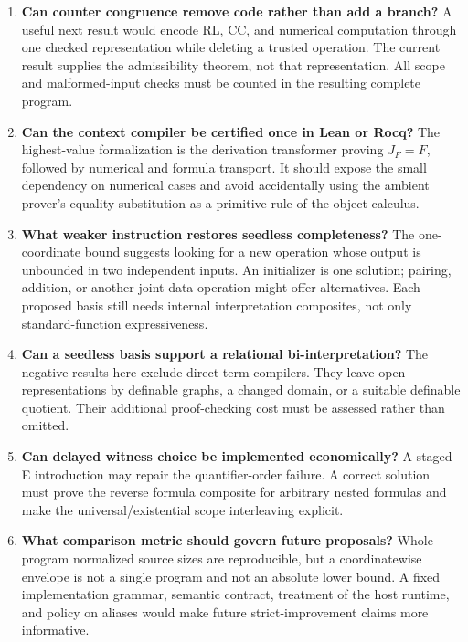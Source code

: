 \documentclass[11pt,letterpaper]{article}
\theoremstyle{definition}\newtheorem{definition}[theorem]{Definition}
\theoremstyle{remark}\newtheorem{remark}[theorem]{Remark}
\begin{document}
\begin{enumerate}
\item \textbf{Can counter congruence remove code rather than add a branch?}
  A useful next result would encode RL, CC, and numerical computation
  through one checked representation while deleting a trusted
  operation. The current result supplies the admissibility theorem, not
  that representation. All scope and malformed-input checks must be
  counted in the resulting complete program.
\item \textbf{Can the context compiler be certified once in Lean or Rocq?}
  The highest-value formalization is the derivation transformer proving
  $J_F=F$, followed by numerical and formula transport. It should expose
  the small dependency on numerical cases and avoid accidentally using
  the ambient prover's equality substitution as a primitive rule of
  the object calculus.
\item \textbf{What weaker instruction restores seedless completeness?}
  The one-coordinate bound suggests looking for a new operation whose
  output is unbounded in two independent inputs. An initializer is one
  solution; pairing, addition, or another joint data operation might
  offer alternatives. Each proposed basis still needs internal
  interpretation composites, not only standard-function expressiveness.
\item \textbf{Can a seedless basis support a relational bi-interpretation?}
  The negative results here exclude direct term compilers. They leave
  open representations by definable graphs, a changed domain, or a
  suitable definable quotient. Their additional proof-checking cost
  must be assessed rather than omitted.
\item \textbf{Can delayed witness choice be implemented economically?}
  A staged E introduction may repair the quantifier-order failure.
  A correct solution must prove the reverse formula composite for
  arbitrary nested formulas and make the universal/existential scope
  interleaving explicit.
\item \textbf{What comparison metric should govern future proposals?}
  Whole-program normalized source sizes are reproducible, but a
  coordinatewise envelope is not a single program and not an absolute
  lower bound. A fixed implementation grammar, semantic contract,
  treatment of the host runtime, and policy on aliases would make
  future strict-improvement claims more informative.
\end{enumerate}
\end{document}
